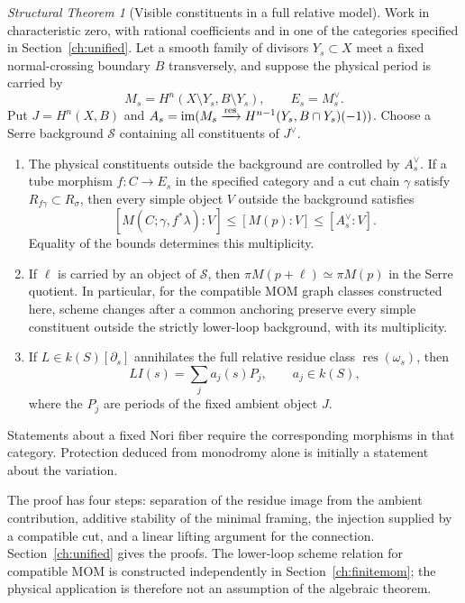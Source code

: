 \documentclass[11pt,a4paper,oneside]{article}
\theoremstyle{plain}
\theoremstyle{definition}
\theoremstyle{remark}
\numberwithin{equation}{section}
\newtheorem*{maintheorem}{Structural Theorem}
\begin{document}
\begin{maintheorem}[Visible constituents in a full relative model]
Work in characteristic zero, with rational coefficients and in one of the categories specified in Section~\ref{ch:unified}. Let a smooth family of divisors $Y_s\subset X$ meet a fixed normal-crossing boundary $B$ transversely, and suppose the physical period is carried by
\[
 M_s=H^n(X\setminus Y_s,B\setminus Y_s),\qquad E_s=M_s^\vee.
\]
Put $J=H^n(X,B)$ and $A_s=\operatorname{im}(M_s\xrightarrow{\rm res}H^{n-1}(Y_s,B\cap Y_s)(-1))$. Choose a Serre background $\mathcal S$ containing all constituents of $J^\vee$.
\begin{enumerate}[label=(\roman*),leftmargin=2em]
\item The physical constituents outside the background are controlled by $A_s^\vee$. If a tube morphism $f:C\to E_s$ in the specified category and a cut chain $\gamma$ satisfy $R_{f\gamma}\subset R_\sigma$, then every simple object $V$ outside the background satisfies
\[
 [M(C;\gamma,f^*\lambda):V]\leq[M(p):V]\leq[A_s^\vee:V].
\]
Equality of the bounds determines this multiplicity.
\item If $\ell$ is carried by an object of $\mathcal S$, then $\pi M(p+\ell)\simeq\pi M(p)$ in the Serre quotient. In particular, for the compatible MOM graph classes constructed here, scheme changes after a common anchoring preserve every simple constituent outside the strictly lower-loop background, with its multiplicity.
\item If $L\in k(S)[\partial_s]$ annihilates the full relative residue class $\operatorname{res}(\omega_s)$, then
\[
 L I(s)=\sum_j a_j(s)P_j,\qquad a_j\in k(S),
\]
where the $P_j$ are periods of the fixed ambient object $J$.
\end{enumerate}
Statements about a fixed Nori fiber require the corresponding morphisms in that category. Protection deduced from monodromy alone is initially a statement about the variation.
\end{maintheorem}

The proof has four steps: separation of the residue image from the ambient contribution, additive stability of the minimal framing, the injection supplied by a compatible cut, and a linear lifting argument for the connection. Section~\ref{ch:unified} gives the proofs. The lower-loop scheme relation for compatible MOM is constructed independently in Section~\ref{ch:finitemom}; the physical application is therefore not an assumption of the algebraic theorem.
\end{document}

